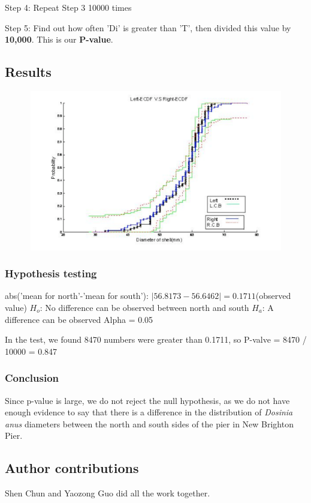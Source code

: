 Step 4: Repeat Step 3 10000 times

Step 5: Find out how often 'Di' is greater than 'T', then divided this value by \textbf{10,000}. 
            This is our \textbf{P-value}.

\subsection{Results}

\begin{figure}[ht]
\begin{center}
\includegraphics[width=13cm,height=7cm]{figures/DosiniaShell_Left_ECDF_against_Right_ECDF.pdf}
\end{center}
\end{figure}

\subsubsection*{Hypothesis testing}
abs('mean for north'-'mean for south'): $|56.8173-56.6462|=0.1711 $(observed value)
\textbf{$H_o$}: No difference can be observed between north and south 
\textbf{$H_a$}: A difference can be observed 
Alpha = 0.05

In the test, we found 8470 numbers were greater than 0.1711, so
 P-valve = 8470 / 10000 = 0.847

\subsubsection{Conclusion}
Since p-value is large, we do not reject the null hypothesis, as we do not have enough evidence to say that there is a difference in the distribution of \textit{Dosinia anus} diameters between the north and south sides of the pier in New Brighton Pier.  

\subsection*{Author contributions}

Shen Chun and Yaozong Guo did all the work together.
